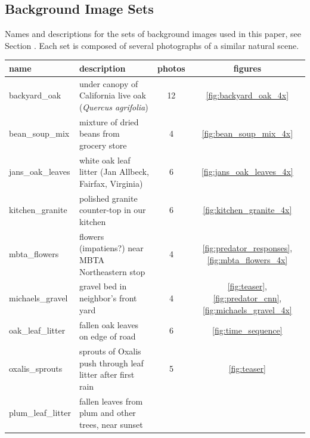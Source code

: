 \documentclass[letterpaper]{article}
\begin{document}

\subsection{Background Image Sets}
\begin{minipage}{\linewidth}
Names and descriptions for the sets of background images used in this paper, see Section . Each set is composed of several photographs of a similar natural scene.
\par
\begin{table}[H]
    \footnotesize
    \centering
    \begin{tabular}{ |l|l|c|c| }
        \hline
        \textbf{name} & \textbf{description} & \textbf{photos} & \textbf{figures} \\ 
        \hline
        backyard\_oak &
            under canopy of California live oak (\textit{Quercus agrifolia}) &
            12 & \ref{fig:backyard_oak_4x} \\
        \hline
        bean\_soup\_mix &
            mixture of dried beans from grocery store &
            4 & \ref{fig:bean_soup_mix_4x} \\
        \hline
        jans\_oak\_leaves &
            white oak leaf litter (Jan Allbeck, Fairfax, Virginia) &
            6 & \ref{fig:jans_oak_leaves_4x} \\
        \hline
        kitchen\_granite &
            polished granite counter-top in our kitchen &
            6 & \ref{fig:kitchen_granite_4x} \\
        \hline
        mbta\_flowers &
            flowers (impatiens?) near MBTA Northeastern stop &
            4 & \ref{fig:predator_responses}, \ref{fig:mbta_flowers_4x} \\
        \hline
        michaels\_gravel &
            gravel bed in neighbor’s front yard &
            4 & \ref{fig:teaser}, \ref{fig:predator_cnn}, \ref{fig:michaels_gravel_4x} \\
        \hline
        oak\_leaf\_litter &
            fallen oak leaves on edge of road &
            6 & \ref{fig:time_sequence} \\
        \hline
        oxalis\_sprouts &
            sprouts of Oxalis push through leaf litter after first rain &
            5 & \ref{fig:teaser} \\
        \hline
        plum\_leaf\_litter &
            fallen leaves from plum and other trees, near sunset &

\end{tabular}
\end{table}
\end{minipage}
\end{document}
